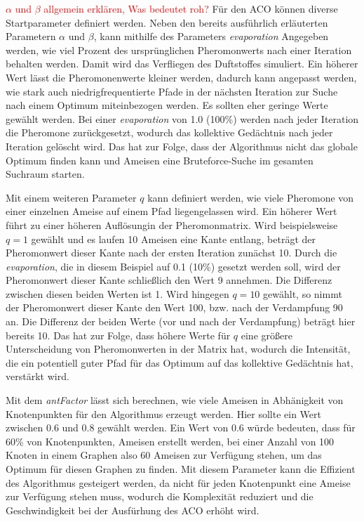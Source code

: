 \textcolor{red}{$\alpha$ und $\beta$ allgemein erklären, Was bedeutet roh?}
Für den ACO können diverse Startparameter definiert werden. Neben den
bereits ausführlich erläuterten Parametern $\alpha$ und $\beta$, kann
mithilfe des Parameters \emph{evaporation} Angegeben werden, wie viel Prozent
des ursprünglichen Pheromonwerts nach einer Iteration behalten werden. Damit
wird das Verfliegen des Duftstoffes simuliert. Ein höherer Wert lässt die
Pheromonenwerte kleiner werden, dadurch kann angepasst werden, wie stark
auch niedrigfrequentierte Pfade in der nächsten Iteration zur Suche nach einem
Optimum miteinbezogen werden. Es sollten eher geringe Werte gewählt werden.
Bei einer \emph{evaporation} von 1.0 (100\%) werden nach jeder Iteration die
Pheromone zurückgesetzt, wodurch das kollektive Gedächtnis nach jeder Iteration
gelöscht wird. Das hat zur Folge, dass der Algorithmus nicht das globale
Optimum finden kann und Ameisen eine Bruteforce-Suche im gesamten Suchraum
starten.

Mit einem weiteren Parameter $q$ kann definiert werden, wie viele
Pheromone von einer einzelnen Ameise auf einem Pfad liegengelassen wird. Ein
höherer Wert führt zu einer höheren \glqq Auflösung\grqq in der Pheromonmatrix.
Wird beispielsweise $q=1$ gewählt und es laufen 10 Ameisen eine Kante entlang,
beträgt der Pheromonwert dieser Kante nach der ersten Iteration zunächst 10.
Durch die \emph{evaporation}, die in diesem Beispiel auf 0.1 (10\%) gesetzt
werden soll, wird der Pheromonwert dieser Kante schließlich den Wert 9
annehmen. Die Differenz zwischen diesen beiden Werten ist 1.
Wird hingegen $q=10$ gewählt, so nimmt der Pheromonwert dieser Kante den
Wert 100, bzw. nach der Verdampfung 90 an. Die Differenz der beiden Werte
(vor und nach der Verdampfung) beträgt hier bereits 10.
Das hat zur Folge, dass höhere Werte für $q$ eine größere Unterscheidung von
Pheromonwerten in der Matrix hat, wodurch die Intensität, die ein potentiell
guter Pfad für das Optimum auf das kollektive Gedächtnis hat, verstärkt wird.

Mit dem \emph{antFactor} lässt sich berechnen, wie viele Ameisen in Abhänigkeit
von Knotenpunkten für den Algorithmus erzeugt werden. Hier sollte ein Wert
zwischen 0.6 und 0.8 gewählt werden. Ein Wert von 0.6 würde bedeuten, dass für
60\% von Knotenpunkten, Ameisen erstellt werden, bei einer Anzahl von 100
Knoten in einem Graphen also 60 Ameisen zur Verfügung stehen, um das Optimum
für diesen Graphen zu finden. Mit diesem Parameter kann die Effizient des
Algorithmus gesteigert werden, da nicht für jeden Knotenpunkt eine Ameise zur
Verfügung stehen muss, wodurch die Komplexität reduziert und die
Geschwindigkeit bei der Ausfürhung des ACO erhöht wird.

